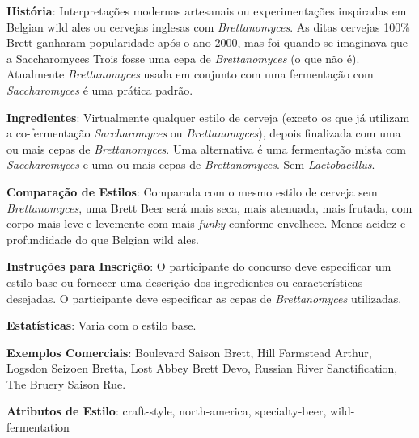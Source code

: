 \textbf{História}: Interpretações modernas artesanais ou experimentações inspiradas em Belgian wild ales ou cervejas inglesas com \textit{Brettanomyces}. As ditas cervejas 100\% Brett ganharam popularidade após o ano 2000, mas foi quando se imaginava que a Saccharomyces Trois fosse uma cepa de \textit{Brettanomyces} (o que não é). Atualmente \textit{Brettanomyces} usada em conjunto com uma fermentação com \textit{Saccharomyces} é uma prática padrão.

\textbf{Ingredientes}: Virtualmente qualquer estilo de cerveja (exceto os que já utilizam a co-fermentação \textit{Saccharomyces} ou \textit{Brettanomyces}), depois finalizada com uma ou mais cepas de \textit{Brettanomyces}. Uma alternativa é uma fermentação mista com \textit{Saccharomyces} e uma ou mais cepas de \textit{Brettanomyces}. Sem \textit{Lactobacillus}.

\textbf{Comparação de Estilos}: Comparada com o mesmo estilo de cerveja sem \textit{Brettanomyces}, uma Brett Beer será mais seca, mais atenuada, mais frutada, com corpo mais leve e levemente com mais \textit{funky} conforme envelhece. Menos acidez e profundidade do que Belgian wild ales.

\textbf{Instruções para Inscrição}: O participante do concurso deve especificar um estilo base ou fornecer uma descrição dos ingredientes ou características desejadas. O participante deve especificar as cepas de \textit{Brettanomyces} utilizadas.

\textbf{Estatísticas}: Varia com o estilo base.

\textbf{Exemplos Comerciais}: Boulevard Saison Brett, Hill Farmstead Arthur, Logsdon Seizoen Bretta, Lost Abbey Brett Devo, Russian River Sanctification, The Bruery Saison Rue.

\textbf{Atributos de Estilo}: craft-style, north-america, specialty-beer, wild-fermentation
